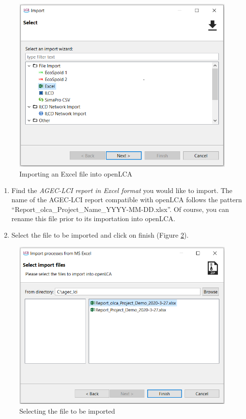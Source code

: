 \documentclass[openany]{book}
\begin{document}
\begin{figure}[ht]

{\centering \includegraphics[width=0.7\linewidth]{Figures/olca_step1} 

}

\caption{Importing an Excel file into openLCA}\label{fig:olca-step1}
\end{figure}

\begin{enumerate}
\def\labelenumi{\arabic{enumi}.}
\setcounter{enumi}{3}
\item
  Find the \emph{AGEC-LCI report in Excel format} you would like to import. The name of the AGEC-LCI report compatible with openLCA follows the pattern ``Report\_olca\_Project\_Name\_YYYY-MM-DD.xlsx''. Of course, you can rename this file prior to its importation into openLCA.
\item
  Select the file to be imported and click on finish (Figure \ref{fig:olca-step2}).
\end{enumerate}

\begin{figure}[ht]

{\centering \includegraphics[width=0.7\linewidth]{Figures/olca_step2} 

}

\caption{Selecting the file to be imported}\label{fig:olca-step2}
\end{figure}
\end{document}
